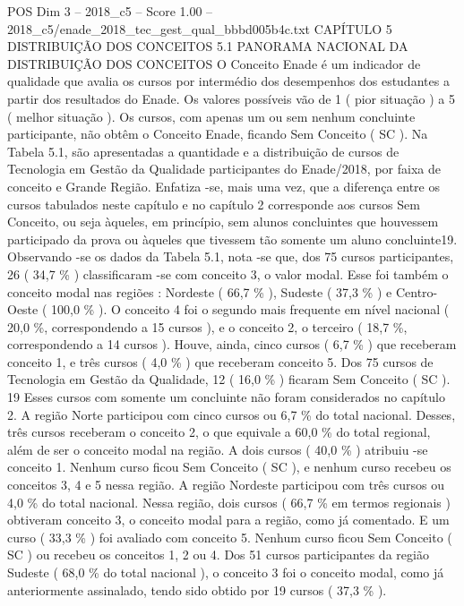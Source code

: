 \begin{textsample}{POS Dim 3 – 2018\_c5 – Score 1.00 – 2018\_c5/enade\_2018\_tec\_gest\_qual\_bbbd005b4c.txt}  \label{ex:f3_pos_190}
CAPÍTULO 5 DISTRIBUIÇÃO DOS CONCEITOS 5.1 PANORAMA NACIONAL DA DISTRIBUIÇÃO DOS CONCEITOS O Conceito Enade é um indicador de qualidade que avalia os cursos por intermédio dos desempenhos dos estudantes a partir dos resultados do Enade.
Os valores possíveis vão de 1 ( pior situação ) a 5 ( melhor situação ).
Os cursos, com apenas um ou sem nenhum concluinte participante, não obtêm o Conceito Enade, ficando Sem Conceito ( SC ).
Na Tabela 5.1, são apresentadas a quantidade e a distribuição de cursos de Tecnologia em Gestão da Qualidade participantes do Enade/2018, por faixa de conceito e Grande Região.
Enfatiza -se, mais uma vez, que a diferença entre os cursos tabulados neste capítulo e no capítulo 2 corresponde aos cursos Sem Conceito, ou seja àqueles, em princípio, sem alunos concluintes que houvessem participado da prova ou àqueles que tivessem tão somente um aluno concluinte19.
Observando -se os dados da Tabela 5.1, nota -se que, dos 75 cursos participantes, 26 ( 34,7 \% ) classificaram -se com conceito 3, o valor modal.
Esse foi também o conceito modal nas regiões : Nordeste ( 66,7 \% ), Sudeste ( 37,3 \% ) e Centro-Oeste ( 100,0 \% ).
O conceito 4 foi o segundo mais frequente em nível nacional ( 20,0 \%, correspondendo a 15 cursos ), e o conceito 2, o terceiro ( 18,7 \%, correspondendo a 14 cursos ).
Houve, ainda, cinco cursos ( 6,7 \% ) que receberam conceito 1, e três cursos ( 4,0 \% ) que receberam conceito 5.
Dos 75 cursos de Tecnologia em Gestão da Qualidade, 12 ( 16,0 \% ) ficaram Sem Conceito ( SC ). 19 Esses cursos com somente um concluinte não foram considerados no capítulo 2.
A região Norte participou com cinco cursos ou 6,7 \% do total nacional.
Desses, três cursos receberam o conceito 2, o que equivale a 60,0 \% do total regional, além de ser o conceito modal na região.
A dois cursos ( 40,0 \% ) atribuiu -se conceito 1.
Nenhum curso ficou Sem Conceito ( SC ), e nenhum curso recebeu os conceitos 3, 4 e 5 nessa região.
A região Nordeste participou com três cursos ou 4,0 \% do total nacional.
Nessa região, dois cursos ( 66,7 \% em termos regionais ) obtiveram conceito 3, o conceito modal para a região, como já comentado.
E um curso ( 33,3 \% ) foi avaliado com conceito 5.
Nenhum curso ficou Sem Conceito ( SC ) ou recebeu os conceitos 1, 2 ou 4.
Dos 51 cursos participantes da região Sudeste ( 68,0 \% do total nacional ), o conceito 3 foi o conceito modal, como já anteriormente assinalado, tendo sido obtido por 19 cursos ( 37,3 \% ).

\end{textsample}

